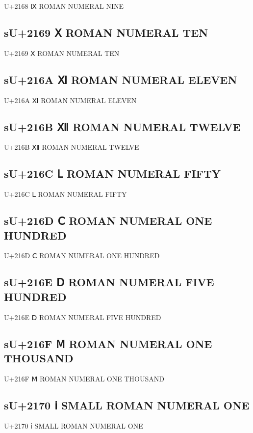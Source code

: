 U+2168 Ⅸ ROMAN NUMERAL NINE

\subsection{sU+2169 Ⅹ ROMAN NUMERAL TEN}

U+2169 Ⅹ ROMAN NUMERAL TEN

\subsection{sU+216A Ⅺ ROMAN NUMERAL ELEVEN}

U+216A Ⅺ ROMAN NUMERAL ELEVEN

\subsection{sU+216B Ⅻ ROMAN NUMERAL TWELVE}

U+216B Ⅻ ROMAN NUMERAL TWELVE

\subsection{sU+216C Ⅼ ROMAN NUMERAL FIFTY}

U+216C Ⅼ ROMAN NUMERAL FIFTY

\subsection{sU+216D Ⅽ ROMAN NUMERAL ONE HUNDRED}

U+216D Ⅽ ROMAN NUMERAL ONE HUNDRED

\subsection{sU+216E Ⅾ ROMAN NUMERAL FIVE HUNDRED}

U+216E Ⅾ ROMAN NUMERAL FIVE HUNDRED

\subsection{sU+216F Ⅿ ROMAN NUMERAL ONE THOUSAND}

U+216F Ⅿ ROMAN NUMERAL ONE THOUSAND

\subsection{sU+2170 ⅰ SMALL ROMAN NUMERAL ONE}

U+2170 ⅰ SMALL ROMAN NUMERAL ONE

